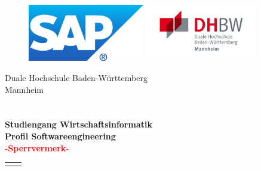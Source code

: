 \documentclass[12pt,a4paper]{scrreprt}
\begin{document}
	\hypertarget{top}{}
	\bookmark[dest=top]{\Titel}
	\thispagestyle{empty}
	\begin{figure}[htbp]
		\begin{minipage}[!t]{4cm}
			\includegraphics[height=2.5cm, natwidth=300, natheight=148]{img/SAPlogo.png}
		\end{minipage}
		\hfill
		\begin{minipage}[!t]{5cm}
			\includegraphics [height=2.5cm, natwidth=553, natheight=282] {img/dhbw.png}
		\end{minipage}
	\end{figure}
	\begin{center}
		\large{Duale Hochschule Baden-Württemberg}\\
		\large{Mannheim}\\
		\Large{\Arbeitstyp}\\
		\vspace{20px}
		\textbf{\Large{\Titel}}\\
		\vspace{20px}
		\normalsize
		\textbf{Studiengang Wirtschaftsinformatik}\\
		\textbf{\small{Profil Softwareengineering}}\\
		\textcolor{red}{\textbf{-Sperrvermerk-}}\\
	\end{center}
	\renewcommand{\arraystretch}{1.5}
	\begin{table}[!b]
		\begin{tabular}{ll}
			\Titelblatt{}
		\end{tabular}
	\end{table}
	\renewcommand{\arraystretch}{1}
	
	\newpage
	\hypertarget{nda}{}
\end{document}
